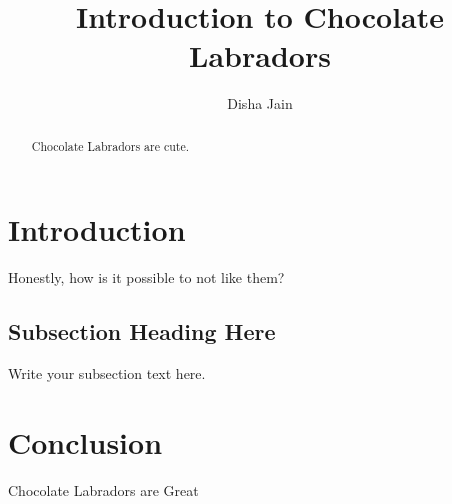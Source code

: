 \documentclass{article}
\begin{document}
\title{Introduction to Chocolate Labradors}
\author{Disha Jain}

\maketitle

\begin{abstract}
Chocolate Labradors are cute.
\end{abstract}

\section{Introduction}
Honestly, how is it possible to not like them?

\subsection{Subsection Heading Here}
Write your subsection text here.

\section{Conclusion}
Chocolate Labradors are Great
\end{document}
